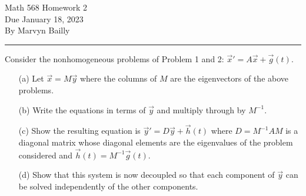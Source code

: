 \documentclass[12pt]{report}
\begin{document}
\large

\begin{center}
 Math 568 Homework 2\\
 Due January 18, 2023\\
 By Marvyn Bailly\\
\end{center}

\normalsize

\hrule



\begin{problem}
    Consider the nonhomogeneous problems of Problem 1 and 2: $\vec{x}' = A\vec{x} + \vec{g}(t)$.
    \begin{enumerate}
        \item [(a)]Let $\vec{x} = M\vec{y}$ where the columns of $M$ are the eigenvectors of the above problems.
        

        \item [(b)]Write the equations in terms of $\vec{y}$ and multiply through by $M^{-1}$. 
        

        \item [(c)]
        Show the resulting equation is $\vec{y}' = D\vec{y} + \vec{h}(t)$ where $D = M^{-1}AM$ is a diagonal matrix whose diagonal elements are the eigenvalues of the problem
        considered and $\vec{h}(t) = M^{-1}\vec{g}(t)$.

        \item[(d)] Show that this system is now decoupled so that each component of $\vec{y}$ can be solved independently
        of the other components.

    \end{enumerate}
\end{problem}
\end{document}
